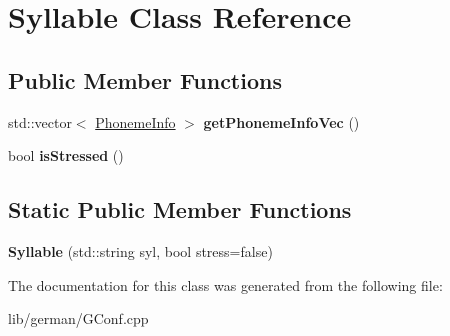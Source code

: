 \hypertarget{classSyllable}{\section{\-Syllable \-Class \-Reference}
\label{classSyllable}
}
\subsection*{\-Public \-Member \-Functions}
\begin{DoxyCompactItemize}
\item 
\hypertarget{classSyllable_a8923a7ec25df98a8ca65620d6e4543df}{std\-::vector$<$ \hyperlink{classsinsy_1_1PhonemeInfo}{\-Phoneme\-Info} $>$ {\bfseries get\-Phoneme\-Info\-Vec} ()}\label{classSyllable_a8923a7ec25df98a8ca65620d6e4543df}

\item 
\hypertarget{classSyllable_acfb7ec942e581f03da4ad1f29b32e8f3}{bool {\bfseries is\-Stressed} ()}\label{classSyllable_acfb7ec942e581f03da4ad1f29b32e8f3}

\end{DoxyCompactItemize}
\subsection*{\-Static \-Public \-Member \-Functions}
\begin{DoxyCompactItemize}
\item 
\hypertarget{classSyllable_a2f4b7a01141518e929ef71b269a8644d}{{\bfseries \-Syllable} (std\-::string syl, bool stress=false)}\label{classSyllable_a2f4b7a01141518e929ef71b269a8644d}

\end{DoxyCompactItemize}


\-The documentation for this class was generated from the following file\-:\begin{DoxyCompactItemize}
\item 
lib/german/\-G\-Conf.\-cpp\end{DoxyCompactItemize}
